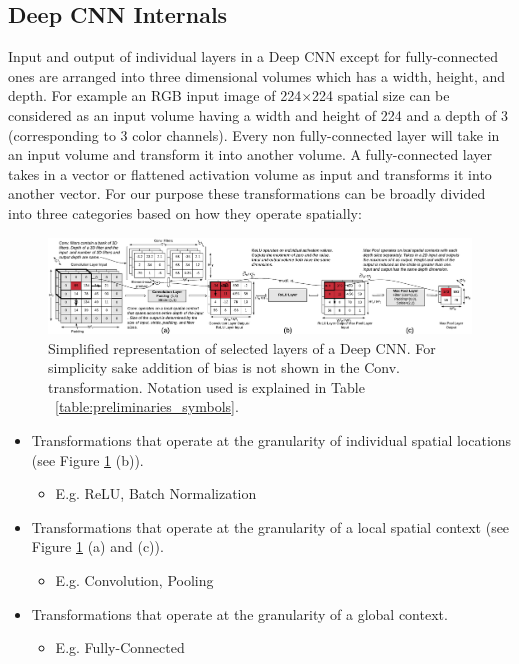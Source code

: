 \subsection{Deep CNN Internals}
Input and output of individual layers in a Deep CNN except for fully-connected ones are arranged into three dimensional volumes which has a width, height, and depth.
For example an RGB input image of 224$\times$224 spatial size can be considered as an input volume having a width and height of 224 and a depth of 3 (corresponding to 3 color channels). Every non fully-connected layer will take in an input volume and transform it into another volume.
A fully-connected layer takes in a vector or flattened activation volume as input and transforms it into another vector. For our purpose these transformations can be broadly divided into three categories based on how they operate spatially:

\begin{figure}[t]
\includegraphics[width=\textwidth]{images/cnn_simplified}
\caption{Simplified representation of selected layers of a Deep CNN. For simplicity sake addition of bias is not shown in the Conv. transformation. Notation used is explained in Table ~\ref{table:preliminaries_symbols}.}
\label{fig:cnn_simplified}
\end{figure}

\begin{itemize}
	\item Transformations that operate at the granularity of individual  spatial locations (see Figure \ref{fig:cnn_simplified} (b)).
	\begin{itemize}
	 \item E.g. ReLU, Batch Normalization
	\end{itemize}
	\item Transformations that operate at the granularity of a local spatial context (see Figure \ref{fig:cnn_simplified} (a) and (c)).
	\begin{itemize}
	 \item E.g. Convolution, Pooling
	\end{itemize}
	\item Transformations that operate at the granularity of a global context.
	\begin{itemize}
	 \item E.g. Fully-Connected
	\end{itemize}
\end{itemize}


